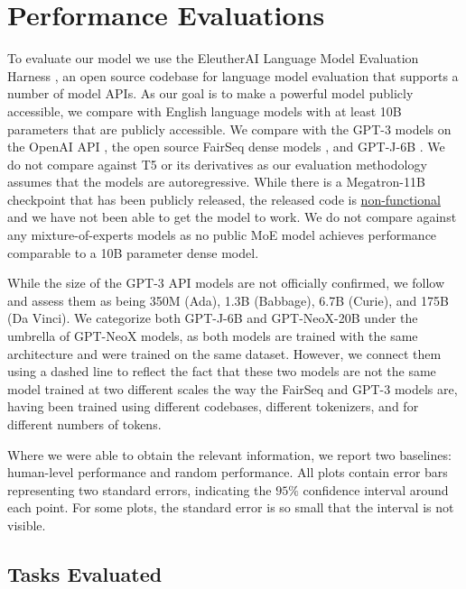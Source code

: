 \documentclass[11pt]{article}
\newcommand{\model}{GPT-NeoX-20B}
\begin{document}
\section{Performance Evaluations}
\label{sec:evals}

To evaluate our model we use the EleutherAI Language Model Evaluation Harness \citep{eval-harness}, an open source codebase for language model evaluation that supports a number of model APIs. As our goal is to make a powerful model publicly accessible, we compare with English language models with at least 10B parameters that are publicly accessible. We compare with the GPT-3 models on the OpenAI API \citep{brown2020language}, the open source FairSeq dense models \citep{fairseq-13B}, and GPT-J-6B \citep{gpt-j}. We do not compare against T5 \citep{raffel2020exploring} or its derivatives as our evaluation methodology assumes that the models are autoregressive. While there is a Megatron-11B checkpoint that has been publicly released, the released code is \href{https://github.com/pytorch/fairseq/issues/2358}{non-functional} and we have not been able to get the model to work. We do not compare against any mixture-of-experts models as no public MoE model achieves performance comparable to a 10B parameter dense model.

While the size of the GPT-3 API models are not officially confirmed, we follow \citet{gao2021sizes} and assess them as being 350M (Ada), 1.3B (Babbage), 6.7B (Curie), and 175B (Da Vinci). We categorize both GPT-J-6B and \model{} under the umbrella of GPT-NeoX models, as both models are trained with the same architecture and were trained on the same dataset. 
However, we connect them using a dashed line to reflect the fact that these two models are not the same model trained at two different scales the way the FairSeq and GPT-3 models are, having been trained using different codebases, different tokenizers, and for different numbers of tokens.

Where we were able to obtain the relevant information, we report two baselines: human-level performance and random performance. All plots contain error bars representing two standard errors, indicating the $95\%$ confidence interval around each point. For some plots, the standard error is so small that the interval is not visible.

\subsection{Tasks Evaluated}
\label{subsec:lm}
\end{document}
